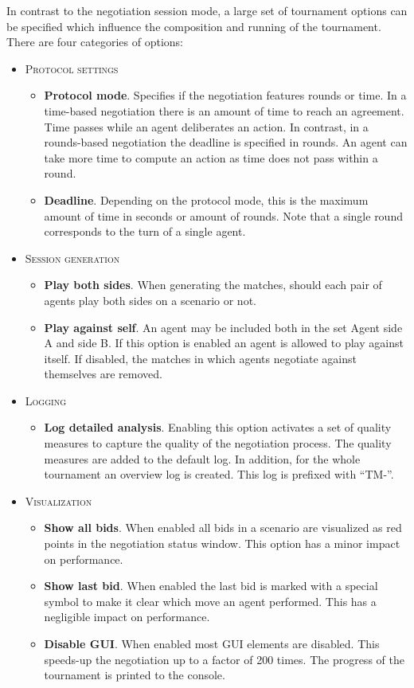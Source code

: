 \documentclass[]{article}
\begin{document}
In contrast to the negotiation session mode, a large set of tournament options can be specified which influence the composition and running of the tournament. There are four categories of options:
\begin{itemize}
	\item \textsc{Protocol settings}
	\begin{itemize}
		\item \textbf{Protocol mode}. Specifies if the negotiation features rounds or time. In a time-based negotiation there is an amount of time to reach an agreement. Time passes while an agent deliberates an action. In contrast, in a rounds-based negotiation the deadline is specified in rounds. An agent can take more time to compute an action as time does not pass within a round.
		\item \textbf{Deadline}. Depending on the protocol mode, this is the maximum amount of time in seconds or amount of rounds. Note that a single round corresponds to the turn of a single agent.
	\end{itemize}
	\item \textsc{Session generation}
	\begin{itemize}
		\item \textbf{Play both sides}. When generating the matches, should each pair of agents play both sides on a scenario or not.
		\item \textbf{Play against self}. An agent may be included both in the set Agent side A and side B. If this option is enabled an agent is allowed to play against itself. If disabled, the matches in which agents negotiate against themselves are removed.
	\end{itemize}
	\item \textsc{Logging}
	\begin{itemize}
		\item \textbf{Log detailed analysis}. Enabling this option activates a set of quality measures to capture the quality of the negotiation process. The quality measures are added to the default log. In addition, for the whole tournament an overview log is created. This log is prefixed with ``TM-''.
	\end{itemize}
	\item \textsc{Visualization}
	\begin{itemize}
		\item \textbf{Show all bids}. When enabled all bids in a scenario are visualized as red points in the negotiation status window. This option has a minor impact on performance.
		\item \textbf{Show last bid}. When enabled the last bid is marked with a special symbol to make it clear which move an agent performed. This has a negligible impact on performance.
		\item \textbf{Disable GUI}. When enabled most GUI elements are disabled. This speeds-up the negotiation up to a factor of 200 times. The progress of the tournament is printed to the console.
	\end{itemize}
\end{itemize}
\end{document}
